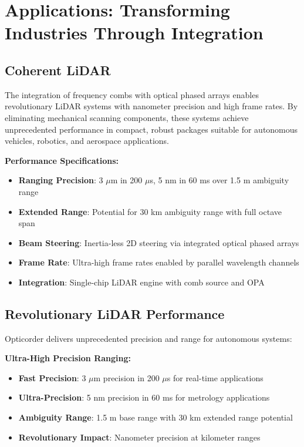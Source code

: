 \documentclass[11pt,a4paper]{article}
\begin{document}
\section{Applications: Transforming Industries Through Integration}

\subsection{Coherent LiDAR}
The integration of frequency combs with optical phased arrays enables revolutionary LiDAR systems with nanometer precision and high frame rates. By eliminating mechanical scanning components, these systems achieve unprecedented performance in compact, robust packages suitable for autonomous vehicles, robotics, and aerospace applications.

\textbf{Performance Specifications:}
\begin{itemize}
\item \textbf{Ranging Precision}: 3 $\mu$m in 200 $\mu$s, 5 nm in 60 ms over 1.5 m ambiguity range
\item \textbf{Extended Range}: Potential for 30 km ambiguity range with full octave span
\item \textbf{Beam Steering}: Inertia-less 2D steering via integrated optical phased arrays
\item \textbf{Frame Rate}: Ultra-high frame rates enabled by parallel wavelength channels
\item \textbf{Integration}: Single-chip LiDAR engine with comb source and OPA
\end{itemize}

\subsection{Revolutionary LiDAR Performance}
Opticorder delivers unprecedented precision and range for autonomous systems:

\textbf{Ultra-High Precision Ranging:}
\begin{itemize}
\item \textbf{Fast Precision}: 3 $\mu$m precision in 200 $\mu$s for real-time applications
\item \textbf{Ultra-Precision}: 5 nm precision in 60 ms for metrology applications
\item \textbf{Ambiguity Range}: 1.5 m base range with 30 km extended range potential
\item \textbf{Revolutionary Impact}: Nanometer precision at kilometer ranges
\end{itemize}
\end{document}
